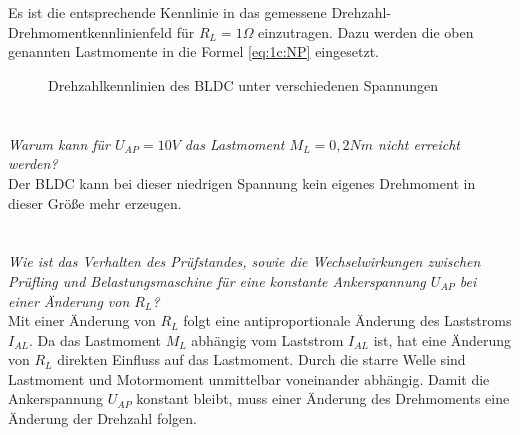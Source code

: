 \section{}\label{sec:5b}
Es ist die entsprechende Kennlinie in das gemessene Drehzahl-Drehmomentkennlinienfeld für $ R_{L} = 1\Omega $ einzutragen. Dazu werden die oben genannten Lastmomente in die Formel \ref{eq:1c:NP} eingesetzt.
\begin{figure}[h]
	\centering
	
	\caption{Drehzahlkennlinien des BLDC unter verschiedenen Spannungen}
	\label{fig:5:drehmomente}
\end{figure}

\section{}\label{sec:5c}
\textit{Warum kann für $ U_{AP} = 10V $ das Lastmoment $ M_{L} = 0,2Nm $ nicht erreicht werden?}\\
Der BLDC kann bei dieser niedrigen Spannung kein eigenes Drehmoment in dieser Größe mehr erzeugen.

\section{}\label{sec:5d}
\textit{Wie ist das Verhalten des Prüfstandes, sowie die Wechselwirkungen zwischen Prüfling und Belastungsmaschine für eine konstante Ankerspannung $ U_{AP} $ bei einer Änderung von $ R_{L} $?}\\
Mit einer Änderung von $ R_{L} $ folgt eine antiproportionale Änderung des Laststroms $ I_{AL} $. Da das Lastmoment $ M_{L} $ abhängig vom Laststrom $ I_{AL} $ ist, hat eine Änderung von $ R_{L} $ direkten Einfluss auf das Lastmoment. Durch die starre Welle sind Lastmoment und Motormoment unmittelbar voneinander abhängig. Damit die Ankerspannung $ U_{AP} $ konstant bleibt, muss einer Änderung des Drehmoments eine Änderung der Drehzahl folgen.

